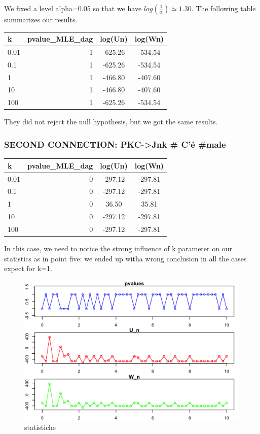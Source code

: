 \documentclass[
]{article}
\begin{document}
We fixed a level alpha=0.05 so that we have
\(log(\frac{1}{\alpha})\simeq1.30\). The following table summarizes our
results.

\begin{longtable}[]{@{}lrcc@{}}
\toprule
k & pvalue\_MLE\_dag & log(Un) & log(Wn)\tabularnewline
\midrule
\endhead
0.01 & 1 & -625.26 & -534.54\tabularnewline
0.1 & 1 & -625.26 & -534.54\tabularnewline
1 & 1 & -466.80 & -407.60\tabularnewline
10 & 1 & -466.80 & -407.60\tabularnewline
100 & 1 & -625.26 & -534.54\tabularnewline
\bottomrule
\end{longtable}

They did not reject the null hypothesis, but we got the same results.

\hypertarget{second-connection-pkc-jnk-cuxe9-male-1}{%
\subsubsection{SECOND CONNECTION: PKC-\textgreater Jnk \# C'é
\#male}\label{second-connection-pkc-jnk-cuxe9-male-1}}

\begin{longtable}[]{@{}lrcc@{}}
\toprule
k & pvalue\_MLE\_dag & log(Un) & log(Wn)\tabularnewline
\midrule
\endhead
0.01 & 0 & -297.12 & -297.81\tabularnewline
0.1 & 0 & -297.12 & -297.81\tabularnewline
1 & 0 & 36.50 & 35.81\tabularnewline
10 & 0 & -297.12 & -297.81\tabularnewline
100 & 0 & -297.12 & -297.81\tabularnewline
\bottomrule
\end{longtable}

In this case, we need to notice the strong influence of k parameter on
our statistics as in point five: we ended up witha wrong conclusion in
all the cases expect for k=1.

\begin{figure}
\centering
\includegraphics{data/statistics_images/Part6.2.png}
\caption{statistiche}
\end{figure}
\end{document}
